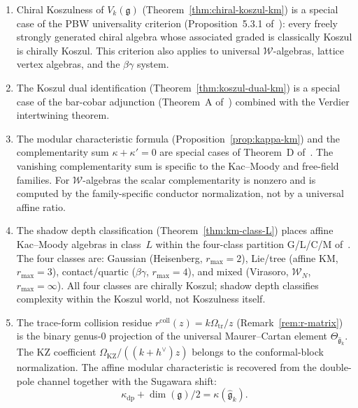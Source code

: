 \documentclass[11pt]{article}
\theoremstyle{plain}
\theoremstyle{definition}
\theoremstyle{remark}
\newcommand{\fg}{\mathfrak{g}}
\newcommand{\ghat}{\widehat{\fg}}
\numberwithin{equation}{section}
\begin{document}
\begin{enumerate}[(1)]
\item Chiral Koszulness of $V_k(\fg)$
 (Theorem~\ref{thm:chiral-koszul-km}) is a special case
 of the PBW universality criterion
 (Proposition~5.3.1 of~\cite{Lor-MKD}):
 every freely strongly generated chiral algebra whose
 associated graded is classically Koszul is chirally Koszul.
 This criterion also applies to universal $\mathcal{W}$-algebras,
 lattice vertex algebras, and the $\beta\gamma$ system.

\item The Koszul dual identification
 (Theorem~\ref{thm:koszul-dual-km}) is a special case of
 the bar-cobar adjunction (Theorem~A of~\cite{Lor-MKD})
 combined with the Verdier intertwining theorem.

\item The modular characteristic formula
 (Proposition~\ref{prop:kappa-km}) and the complementarity
 sum $\kappa + \kappa' = 0$ are special cases of
 Theorem~D of~\cite{Lor-MKD}. The vanishing
 complementarity sum is specific to the Kac--Moody and
 free-field families. For $\mathcal{W}$-algebras the
 scalar complementarity is nonzero and is computed by the
 family-specific conductor normalization, not by a universal
 affine ratio.

\item The shadow depth classification
 (Theorem~\ref{thm:km-class-L}) places affine Kac--Moody
 algebras in class~$L$ within the four-class partition
 G/L/C/M of~\cite{Lor-MKD}. The four classes are:
 Gaussian (Heisenberg, $r_{\max} = 2$),
 Lie/tree (affine KM, $r_{\max} = 3$),
 contact/quartic ($\beta\gamma$, $r_{\max} = 4$),
 and mixed (Virasoro, $\mathcal{W}_N$, $r_{\max} = \infty$).
 All four classes are chirally Koszul; shadow depth
 classifies complexity within the Koszul world,
 not Koszulness itself.

\item The trace-form collision residue \(r^{\mathrm{coll}}(z)
 = k\Omega_{\mathrm{tr}}/z\)
 (Remark~\ref{rem:r-matrix}) is the binary genus-$0$
 projection of the universal Maurer--Cartan element
 \(\Theta_{\ghat_k}\). The KZ coefficient
 \(\Omega_{\mathrm{KZ}}/((k+h^\vee)z)\) belongs to the
 conformal-block normalization. The affine modular characteristic is
 recovered from the double-pole channel together with the Sugawara
 shift:
 \[
 \kappa_{\mathrm{dp}}+\dim(\fg)/2=\kappa(\ghat_k).
 \]
\end{enumerate}

\end{document}
